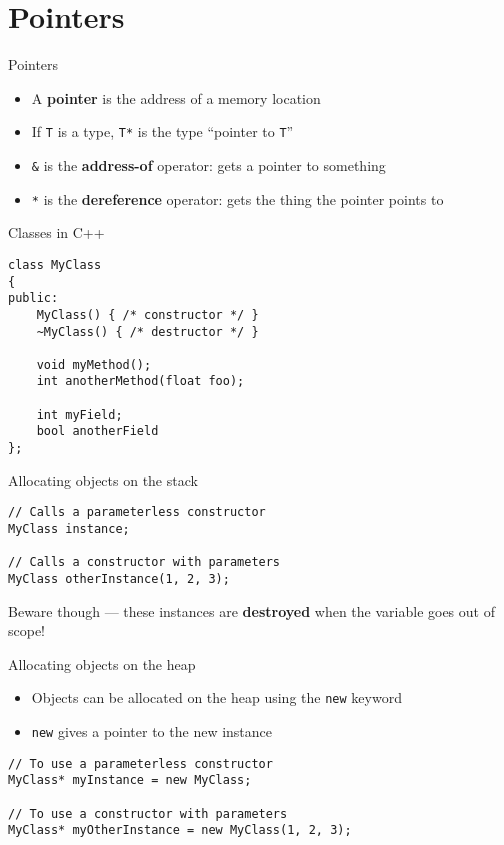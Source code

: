 \part{Pointers}
\frame{\partpage}

\begin{frame}[fragile]{Pointers}
    \begin{itemize}
        \item A \textbf{pointer} is the address of a memory location \pause
        \item If \lstinline{T} is a type, \lstinline{T*} is the type ``pointer to \lstinline{T}'' \pause
        \item \lstinline{&} is the \textbf{address-of} operator: gets a pointer to something \pause
        \item \lstinline{*} is the \textbf{dereference} operator: gets the thing the pointer points to
    \end{itemize}
\end{frame}

\begin{frame}[fragile]{Classes in C++}
	\begin{lstlisting}
class MyClass
{
public:
	MyClass() { /* constructor */ }
	~MyClass() { /* destructor */ }
	
	void myMethod();
	int anotherMethod(float foo);
	
	int myField;
	bool anotherField
};
	\end{lstlisting}
\end{frame}

\begin{frame}[fragile]{Allocating objects on the stack}
	\pause
	\begin{lstlisting}
// Calls a parameterless constructor
MyClass instance;

// Calls a constructor with parameters
MyClass otherInstance(1, 2, 3);
	\end{lstlisting}
	\pause Beware though --- these instances are \textbf{destroyed} when the variable goes out of scope!
\end{frame}

\begin{frame}[fragile]{Allocating objects on the heap}
    \begin{itemize}
        \item Objects can be allocated on the heap using the \lstinline{new} keyword \pause
        \item \lstinline{new} gives a pointer to the new instance
    \end{itemize}
    \pause
    \begin{lstlisting}
// To use a parameterless constructor
MyClass* myInstance = new MyClass;

// To use a constructor with parameters
MyClass* myOtherInstance = new MyClass(1, 2, 3);
    \end{lstlisting}
\end{frame}


